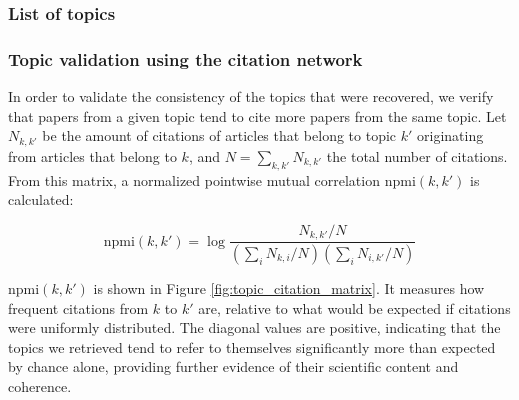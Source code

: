 \documentclass{article}
\begin{document}
\subsubsection{List of topics}

\fontsize{6}{7}\selectfont\normalsize

\subsubsection{\label{appendix:citation_validation}Topic validation using the citation network}

In order to validate the consistency of the topics that were recovered, we verify that papers from a given topic tend to cite more papers from the same topic. Let $N_{k,k'}$ be the amount of citations of articles that belong to topic $k'$ originating from articles that belong to $k$, and $N=\sum_{k,k'}N_{k,k'}$ the total number of citations. From this matrix, a normalized pointwise mutual correlation $\mathrm{npmi}(k,k')$ is calculated:

\begin{equation}
    \mathrm{npmi}(k,k') = \log {\dfrac{N_{k,k'}/N}{(\sum_{i} N_{k,i}/N)(\sum_{i} N_{i,k'}/N)}}
\end{equation}

$\mathrm{npmi}(k,k')$ is shown in Figure \ref{fig:topic_citation_matrix}. It measures how frequent citations from $k$ to $k'$ are, relative to what would be expected if citations were uniformly distributed. The diagonal values are positive, indicating that the topics we retrieved tend to refer to themselves significantly more than expected by chance alone, providing further evidence of their scientific content and coherence.
\end{document}
